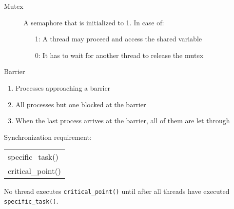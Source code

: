 \begin{frame}
  \begin{description}
  \item[Mutex] A semaphore that is initialized to 1. In case of:
    \begin{itemize}
    \item[1:] A thread may proceed and access the shared variable
    \item[0:] It has to wait for another thread to release the mutex
    \end{itemize}
  \end{description}
  \begin{center}
  \end{center}
\end{frame}

\begin{frame}
  \centering%
\end{frame}

\begin{frame}
\begin{center}
\end{center}
\end{frame}

\begin{frame}{Barrier}
  \centering
  \mode<beamer>{ \texttt{[image: barrier]} }%

  {\small
  \begin{enumerate}
  \item Processes approaching a barrier
  \item All processes but one blocked at the barrier
  \item When the last process arrives at the barrier, all of them are let through
  \end{enumerate}}

  \begin{iblock}{Synchronization requirement:}
    \begin{center}\ttfamily
      \begin{tabular}{l}
        specific\_task()\\
        critical\_point()
      \end{tabular}
    \end{center}
    No thread executes \texttt{critical\_point()} until after all threads have executed
    \texttt{specific\_task()}.
  \end{iblock}
\end{frame}

